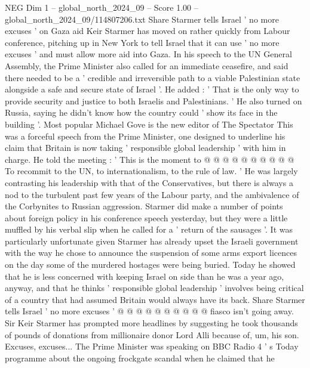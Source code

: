 \begin{textsample}{NEG Dim 1 – global\_north\_2024\_09 – Score 1.00 – global\_north\_2024\_09/114807206.txt}  \label{ex:f1_neg_365}
Share Starmer tells Israel ' no more excuses ' on Gaza aid Keir Starmer has moved on rather quickly from Labour conference, pitching up in New York to tell Israel that it can use ' no more excuses ' and must allow more aid into Gaza.
In his speech to the UN General Assembly, the Prime Minister also called for an immediate ceasefire, and said there needed to be a ' credible and irreversible path to a viable Palestinian state alongside a safe and secure state of Israel '.
He added : ' That is the only way to provide security and justice to both Israelis and Palestinians. ' He also turned on Russia, saying he didn't know how the country could ' show its face in the building '.
Most popular Michael Gove is the new editor of The Spectator This was a forceful speech from the Prime Minister, one designed to underline his claim that Britain is now taking ' responsible global leadership ' with him in charge.
He told the meeting : ' This is the moment to @ @ @ @ @ @ @ @ @ @ To recommit to the UN, to internationalism, to the rule of law. ' He was largely contrasting his leadership with that of the Conservatives, but there is always a nod to the turbulent past few years of the Labour party, and the ambivalence of the Corbynites to Russian aggression.
Starmer did make a number of points about foreign policy in his conference speech yesterday, but they were a little muffled by his verbal slip when he called for a ' return of the sausages '.
It was particularly unfortunate given Starmer has already upset the Israeli government with the way he chose to announce the suspension of some arms export licences on the day some of the murdered hostages were being buried.
Today he showed that he is less concerned with keeping Israel on side than he was a year ago, anyway, and that he thinks ' responsible global leadership ' involves being critical of a country that had assumed Britain would always have its back.
Share Starmer tells Israel ' no more excuses ' @ @ @ @ @ @ @ @ @ @ fiasco isn't going away.
Sir Keir Starmer has prompted more headlines by suggesting he took thousands of pounds of donations from millionaire donor Lord Alli because of, um, his son.
Excuses, excuses...
The Prime Minister was speaking on BBC Radio 4 ' s Today programme about the ongoing frockgate scandal when he claimed that he

\end{textsample}
